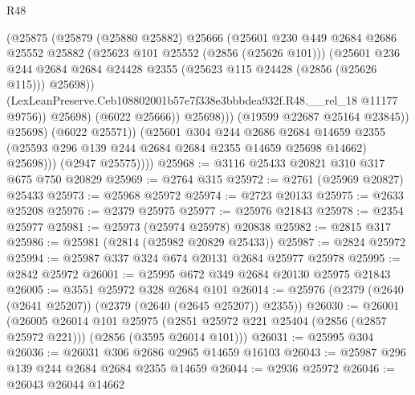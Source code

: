 \begin{lexlean}{R48}
\begin{coremodule}
                            (@25875
                              (@25879
                                (@25880 @25882)
                                @25666
                                (@25601
                                  @230
                                  @449
                                  @2684
                                  @2686
                                  @25552
                                  @25882
                                  (@25623 @101 @25552 (@2856 (@25626 @101)))
                                  (@25601
                                    @236
                                    @244
                                    @2684
                                    @2684
                                    @24428
                                    @2355
                                    (@25623 @115 @24428 (@2856 (@25626 @115)))
                                    @25698))
                                (LexLeanPreserve.Ceb108802001b57e7f338e3bbbdea932f.R48.__rel_18
                                  @11177
                                  @9756))
                              @25698)
                            (@6022 @25666))
                          @25698)))
                    (@19599 @22687 @25164 @23845))
                  @25698)
                (@6022 @25571))
              (@25601
                @304
                @244
                @2686
                @2684
                @14659
                @2355
                (@25593 @296 @139 @244 @2684 @2684 @2355 @14659 @25698 @14662)
                @25698)))
          (@2947 @25575))))
@25968 := @3116 @25433 @20821 @310 @317 @675 @750 @20829
@25969 := @2764 @315
@25972 := @2761 (@25969 @20827) @25433
@25973 := @25968 @25972
@25974 := @2723 @20133
@25975 := @2633 @25208
@25976 := @2379 @25975
@25977 := @25976 @21843
@25978 := @2354 @25977
@25981 := @25973 (@25974 @25978) @20838
@25982 := @2815 @317
@25986 := @25981 (@2814 (@25982 @20829 @25433))
@25987 := @2824 @25972
@25994 := @25987 @337 @324 @674 @20131 @2684 @25977 @25978
@25995 := @2842 @25972
@26001 := @25995 @672 @349 @2684 @20130 @25975 @21843
@26005 := @3551 @25972 @328 @2684 @101
@26014 := @25976 (@2379 (@2640 (@2641 @25207)) (@2379 (@2640 (@2645 @25207)) @2355))
@26030 := @26001
    (@26005
      @26014
      @101
      @25975
      (@2851 @25972 @221 @25404 (@2856 (@2857 @25972 @221)))
      (@2856 (@3595 @26014 @101)))
@26031 := @25995 @304
@26036 := @26031 @306 @2686 @2965 @14659 @16103
@26043 := @25987 @296 @139 @244 @2684 @2684 @2355 @14659
@26044 := @2936 @25972
@26046 := @26043 @26044 @14662

\end{coremodule}
\end{lexlean}
